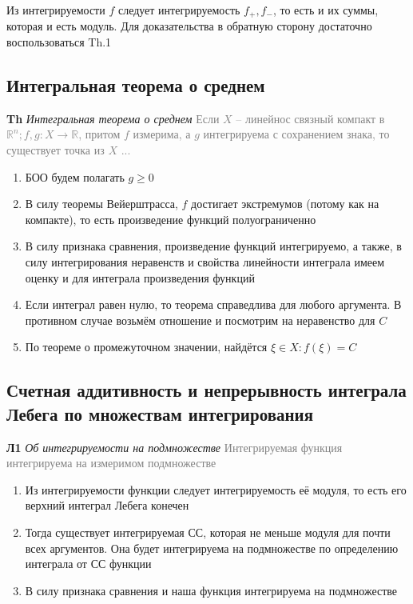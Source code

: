 Из интегрируемости $f$ следует интегрируемость $f_+, f_-$, то есть и их суммы, которая и есть модуль.
Для доказательства в обратную сторону достаточно воспользоваться Th.1

\subsection{Интегральная теорема о среднем}

\textbf{Th} \textit{Интегральная теорема о среднем} \textcolor{gray}{Если $X$ -- линейнос связный компакт
в $\mathbb{R}^n; f, g: X \rightarrow \mathbb{R}$, притом $f$ измерима, а $g$ интегрируема с сохранением знака, то
существует точка из $X$ ...}

\begin{enumerate}
    \item БОО будем полагать $g \geq 0$
    \item В силу теоремы Вейерштрасса, $f$ достигает экстремумов (потому как на компакте), то есть произведение
    функций полуограниченно
    \item В силу признака сравнения, произведение функций интегрируемо, а также, в силу интегрирования неравенств
    и свойства линейности интеграла имеем оценку и для интеграла произведения функций
    \item Если интеграл равен нулю, то теорема справедлива для любого аргумента.
    В противном случае возьмём отношение и посмотрим на неравенство для $C$
    \item По теореме о промежуточном значении, найдётся $\xi \in X: f(\xi) = C$
\end{enumerate}

\subsection{Счетная аддитивность и непрерывность интеграла Лебега по множествам интегрирования}

\textbf{Л1} \textit{Об интегрируемости на подмножестве} \textcolor{gray}{Интегрируемая функция интегрируема на
измеримом подмножестве}

\begin{enumerate}
    \item Из интегрируемости функции следует интегрируемость её модуля, то есть его верхний интеграл Лебега конечен
    \item Тогда существует интегрируемая СС, которая не меньше модуля для почти всех аргументов.
    Она будет интегрируема на подмножестве по определению интеграла от СС функции
    \item В силу признака сравнения и наша функция интегрируема на подмножестве
\end{enumerate}

